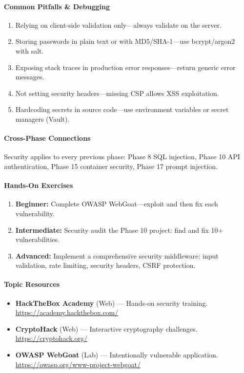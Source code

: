 \documentclass[11pt, a4paper, oneside]{report}
\begin{document}
\paragraph{Common Pitfalls \& Debugging}
\begin{enumerate}[leftmargin=*]
\item Relying on client-side validation only---always validate on the server.
\item Storing passwords in plain text or with MD5/SHA-1---use bcrypt/argon2 with salt.
\item Exposing stack traces in production error responses---return generic error messages.
\item Not setting security headers---missing CSP allows XSS exploitation.
\item Hardcoding secrets in source code---use environment variables or secret managers (Vault).
\end{enumerate}

\paragraph{Cross-Phase Connections} Security applies to every previous phase: Phase 8 SQL injection, Phase 10 API authentication, Phase 15 container security, Phase 17 prompt injection.

\paragraph{Hands-On Exercises}
\begin{enumerate}[leftmargin=*]
\item \textbf{Beginner:} Complete OWASP WebGoat---exploit and then fix each vulnerability.
\item \textbf{Intermediate:} Security audit the Phase 10 project: find and fix 10+ vulnerabilities.
\item \textbf{Advanced:} Implement a comprehensive security middleware: input validation, rate limiting, security headers, CSRF protection.
\end{enumerate}

\paragraph{Topic Resources}
\begin{itemize}[leftmargin=*]
\item \textbf{HackTheBox Academy} (Web) --- Hands-on security training. \url{https://academy.hackthebox.com/}
\item \textbf{CryptoHack} (Web) --- Interactive cryptography challenges. \url{https://cryptohack.org/}
\item \textbf{OWASP WebGoat} (Lab) --- Intentionally vulnerable application. \url{https://owasp.org/www-project-webgoat/}
\end{itemize}
\end{document}
